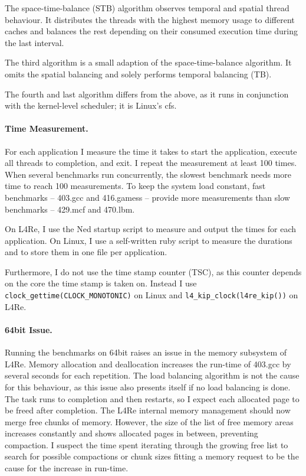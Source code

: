 The space-time-balance (STB) algorithm observes temporal and spatial thread
behaviour.
It distributes the threads with the highest memory usage to different caches
and balances the rest depending on their consumed execution time during the
last interval.

The third algorithm is a small adaption of the space-time-balance algorithm.
It omits the spatial balancing and solely performs temporal balancing (TB).

The fourth and last algorithm differs from the above, as it runs in
conjunction with the kernel-level scheduler; it is Linux's \gls{cfs}.


\paragraph{Time Measurement.}
For each application I measure the time it takes to start the application,
execute all threads to completion, and exit.
I repeat the measurement at least 100 times.
When several benchmarks run concurrently, the slowest benchmark needs more time
to reach 100 measurements.
To keep the system load constant, fast benchmarks -- 403.gcc and  416.gamess --
provide more measurements than slow benchmarks -- 429.mcf and 470.lbm.

On L4Re, I use the Ned startup script to measure and output the times for
each application.
On Linux, I use a self-written ruby script to measure the durations and to
store them in one file per application.

Furthermore, I do not use the time stamp counter (TSC), as this counter depends
on the core the time stamp is taken on.
Instead I use \texttt{clock\_gettime(CLOCK\_MONOTONIC)} on Linux and
\texttt{l4\_kip\_clock(l4re\_kip())} on L4Re.


\paragraph{64bit Issue.}
Running the benchmarks on 64bit raises an issue in the memory subsystem of L4Re.
Memory allocation and deallocation increases the run-time of 403.gcc by several
seconds for each repetition.
The load balancing algorithm is not the cause for this behaviour, as this issue also
presents itself if no load balancing is done.
The task runs to completion and then restarts, so I expect each allocated
page to be freed after completion.
The L4Re internal memory management should now merge free chunks of memory.
However, the size of the list of free memory areas increases constantly and
shows allocated pages in between, preventing compaction.
I suspect the time spent iterating through the growing free list to search for
possible compactions or chunk sizes fitting a memory request to be the cause
for the increase in run-time.

